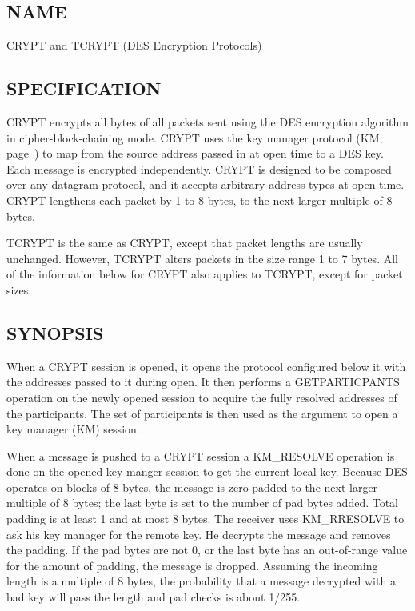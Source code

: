 %
%

\subsection*{NAME}
\label{CRYPT}

\noindent CRYPT and TCRYPT (DES Encryption Protocols)



\subsection*{SPECIFICATION}

\noindent
CRYPT encrypts all bytes of all packets sent using the DES encryption 
algorithm in cipher-block-chaining mode.
CRYPT uses the key manager protocol (KM, page~\pageref{KM}) to map from the 
source address passed in at open time to a DES key. Each message is 
encrypted independently. CRYPT is designed to be composed over any
datagram protocol, and it accepts arbitrary address types at 
open time.  CRYPT lengthens each packet by 1 to 8 bytes, to the
next larger multiple of 8 bytes.

TCRYPT is the same as CRYPT, except that packet lengths are usually unchanged.
However, TCRYPT alters packets in the size range 1 to 7 bytes.  All of
the information below for CRYPT also applies to TCRYPT, except for
packet sizes.

\subsection*{SYNOPSIS}

\noindent 
When a CRYPT session is opened, it opens the protocol configured below 
it with the addresses passed to it during open. It then performs a 
GETPARTICPANTS operation on the newly opened session 
to acquire the fully resolved addresses of the participants. The
set of participants is then used as the argument to open a key manager (KM)
session. 

When a message is pushed to a CRYPT session a KM\_RESOLVE operation is
done on the opened key manger session to get the current local key.
Because DES operates on blocks of 8 bytes, the message is zero-padded to
the next larger multiple of 8 bytes; the last byte is set to the
number of pad bytes added.  Total padding is at least 1 and at most 8
bytes.  The receiver uses KM\_RRESOLVE to ask his key manager for the
remote key.  He decrypts the message and removes the padding. If the
pad bytes are not 0, or the last byte has an out-of-range value for
the amount of padding, the message is dropped.  Assuming the incoming
length is a multiple of 8 bytes, the probability that a message
decrypted with a bad key will pass the length and pad checks is about
1/255.

